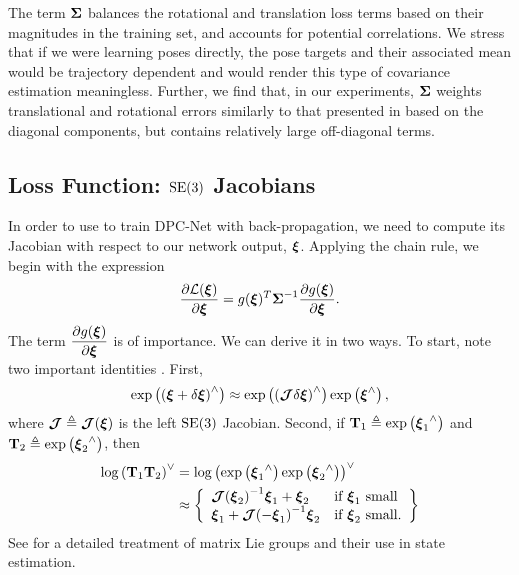 The term $\boldsymbol{\mathbf{\Sigma}}$ balances the rotational and translation loss terms based on their magnitudes in the training set, and accounts for potential correlations. We stress that if we were learning poses directly, the pose targets and their associated mean would be trajectory dependent and would render this type of covariance estimation meaningless. Further, we find that, in our experiments, $\boldsymbol{\mathbf{\Sigma}}$ weights translational and rotational errors similarly to that presented in \cite{Kendall2017-ix} %
 based on the diagonal components, but contains relatively large off-diagonal terms.

\subsection{Loss Function: $\mathrm{SE}(3)$ Jacobians}
In order to use  to train DPC-Net with back-propagation, we need to compute its Jacobian with respect to our network output, $\boldsymbol{\mathbf{\xi}}$. Applying the chain rule, we begin with the expression
\begin{equation}
	\label{eq:se3_jacobchainrule}
	\dfrac{\partial \mathcal{L} (\boldsymbol{\mathbf{\xi}}) }{\partial  \boldsymbol{\mathbf{\xi}}} =  g({\boldsymbol{\mathbf{\xi}}})^T {\boldsymbol{\mathbf{\Sigma}}}^{-1} \dfrac{\partial g({\boldsymbol{\mathbf{\xi}}})}{\partial \boldsymbol{\mathbf{\xi}}}.
\end{equation}
The term $\dfrac{\partial g({\boldsymbol{\mathbf{\xi}}})}{\partial \boldsymbol{\mathbf{\xi}}}$ is of importance. We can derive it in two ways. To start, note two important identities \cite{Barfoot2017-ri}. First,
\begin{equation}
	\label{eq:delta_xi_exp}
\mathrm{exp}\left({( \boldsymbol{\mathbf{\xi}} + \delta \boldsymbol{\mathbf{\xi}})}^{\wedge}\right) \approx \mathrm{exp}\left({(\boldsymbol{\mathbf{\mathcal{J}}} \delta \boldsymbol{\mathbf{\xi}})}^{\wedge}\right) \mathrm{exp}\left({\boldsymbol{\mathbf{\xi}}}^{\wedge}\right),
\end{equation}
where $\boldsymbol{\mathbf{\mathcal{J}}} \triangleq \boldsymbol{\mathbf{\mathcal{J}}}(\boldsymbol{\mathbf{\xi}})$ is the left $\mathrm{SE}(3)$ Jacobian.
Second, if $\boldsymbol{\mathbf{T}}_1 \triangleq \mathrm{exp}\left({\boldsymbol{\mathbf{\xi}}_1}^{\wedge}\right)$ and $\boldsymbol{\mathbf{T}}_2 \triangleq \mathrm{exp}\left({\boldsymbol{\mathbf{\xi}}_2}^{\wedge}\right)$, then
\begin{align}
	\label{eq:jacobian_xi_small}
\mathrm{log}\left({\boldsymbol{\mathbf{T}}_1 \boldsymbol{\mathbf{T}}_2}\right)^{\vee} &= \mathrm{log}\left({ \mathrm{exp}\left({\boldsymbol{\mathbf{\xi}}_1}^{\wedge}\right) \mathrm{exp}\left({\boldsymbol{\mathbf{\xi}}_2}^{\wedge}\right) }\right)^{\vee} \nonumber \\
								  &\approx \left\{
	\begin{array}{ll}
		{  \boldsymbol{\mathbf{\mathcal{J}}}  (  \boldsymbol{\mathbf{\xi}}  _2)}^{-1} \boldsymbol{\mathbf{\xi}}_1 + \boldsymbol{\mathbf{\xi}}_2   & \mbox{if } \boldsymbol{\mathbf{\xi}}_1 ~ \mbox{small} \\
		\boldsymbol{\mathbf{\xi}}_1 + {\boldsymbol{\mathbf{\mathcal{J}}}(-\boldsymbol{\mathbf{\xi}}_1)}^{-1} \boldsymbol{\mathbf{\xi}}_2 & \mbox{if } \boldsymbol{\mathbf{\xi}}_2 ~ \mbox{small}.
	\end{array}
\right\}
\end{align}
See \cite{Barfoot2017-ri} for a detailed treatment of matrix Lie groups and their use in state estimation.
